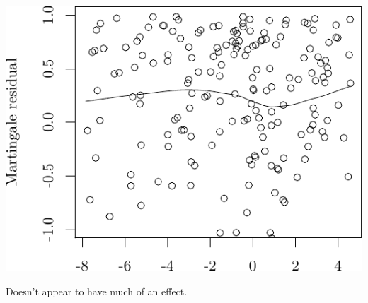 \documentclass{article}\usepackage[]{graphicx}\usepackage[]{color}
\makeatletter
\def\maxwidth{ %
  \ifdim\Gin@nat@width>\linewidth
    \linewidth
  \else
    \Gin@nat@width
  \fi
}
\newenvironment{knitrout}{}{} %
\makeatother
\begin{document}
\begin{knitrout}
{\centering \includegraphics[width=\maxwidth]{figure/05-eda-func-form-date-2} 

}



\end{knitrout}
Doesn't appear to have much of an effect.
\end{document}
